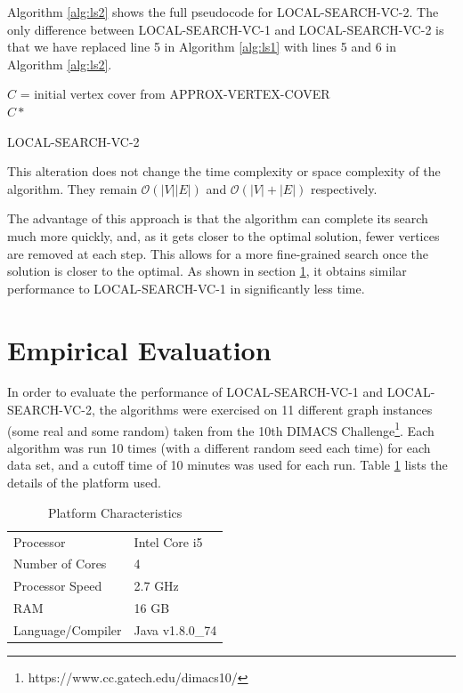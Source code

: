 \documentclass[sigconf]{acmart}
\newcommand{\bigo}[1]{\mathcal{O}(#1)}
\begin{document}
Algorithm \ref{alg:ls2} shows the full pseudocode for LOCAL-SEARCH-VC-2. The only difference between LOCAL-SEARCH-VC-1 and LOCAL-SEARCH-VC-2 is that we have replaced line 5 in Algorithm \ref{alg:ls1} with lines 5 and 6 in Algorithm \ref{alg:ls2}. 
\begin{algorithm}[h]
	\SetAlgoNoLine
	$C$ = initial vertex cover from APPROX-VERTEX-COVER\\
	\Return $C*$
	\caption{LOCAL-SEARCH-VC-2}
	\label{alg:ls2}
\end{algorithm}

This alteration does not change the time complexity or space complexity of the algorithm. They remain $\bigo{|V||E|}$ and $\bigo{|V| + |E|}$ respectively.

The advantage of this approach is that the algorithm can complete its search much more quickly, and, as it gets closer to the optimal solution, fewer vertices are removed at each step. This allows for a more fine-grained search once the solution is closer to the optimal. As shown in section \ref{sec:eval}, it obtains similar performance to LOCAL-SEARCH-VC-1 in significantly less time.

\section{Empirical Evaluation} \label{sec:eval}
In order to evaluate the performance of LOCAL-SEARCH-VC-1 and LOCAL-SEARCH-VC-2, the algorithms were exercised on 11 different graph instances (some real and some random) taken from the 10th DIMACS Challenge\footnote{https://www.cc.gatech.edu/dimacs10/}. 
Each algorithm was run 10 times (with a different random seed each time) for each data set, and a cutoff time of 10 minutes was used for each run. Table \ref{table:platfm} lists the details of the platform used.
\begin{table}[h]
	\caption{Platform Characteristics}
	\label{table:platfm}
	\begin{tabular}{ll}
		\toprule
		Processor    		&	Intel Core i5 	\\
		Number of Cores		&	4				\\
		Processor Speed 	&	2.7 GHz			\\
		RAM					&	16 GB			\\
		Language/Compiler	&	Java v1.8.0\_74	\\
		\bottomrule
	\end{tabular}
\end{table}
\end{document}
